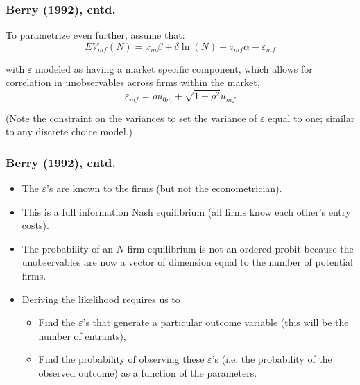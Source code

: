\documentclass[notes=show]{beamer}
\begin{document}
\begin{frame}%

\frametitle{Berry (1992), cntd.}

To parametrize even further, assume that:\ \ 
\begin{equation}
EV_{mf}(N)=x_{m}\beta +\delta \ln (N)-z_{mf}\alpha -\varepsilon _{mf}
\label{entry6}
\end{equation}

with $\varepsilon $ modeled as having a market specific component, which
allows for correlation in unobservables across firms within the market, 
\begin{equation*}
\varepsilon _{mf}=\rho u_{0m}+\sqrt{1-\rho ^{2}}u_{mf}
\end{equation*}

(Note the constraint on the variances to set the variance of $\varepsilon $
equal to one; similar to any discrete choice model.)

\end{frame}%

\begin{frame}%

\frametitle{Berry (1992), cntd.}

\begin{itemize}
\item The $\varepsilon $'s are known to the firms (but not the
econometrician).

\item This is a full information Nash equilibrium (all firms know each
other's entry costs).

\item The probability of an $N$ firm equilibrium is not an ordered probit
because the unobservables are now a vector of dimension equal to the number
of potential firms.

\item Deriving the likelihood requires us to

\begin{itemize}
\item Find the $\varepsilon $'s that generate a particular outcome variable
(this will be the number of entrants),

\item Find the probability of observing these $\varepsilon $'s (i.e. the
probability of the observed outcome) as a function of the parameters.
\end{itemize}
\end{itemize}

\end{frame}%
\end{document}
